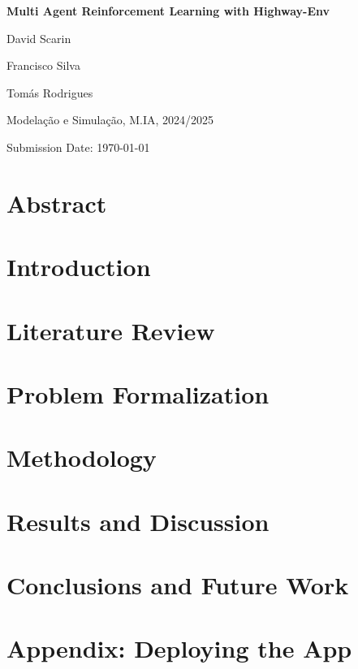 \documentclass[a4paper,10pt]{report}
\begin{document}
\begin{titlepage}
    \centering
    {\Huge\bfseries Multi Agent Reinforcement Learning with Highway-Env\par}
    \vspace{1cm}
    {\Large David Scarin\par}
    {\Large Francisco Silva\par}
    {\Large Tomás Rodrigues\par}
    \vspace{1cm}
    {\Large Modelação e Simulação, M.IA, 2024/2025\par}
    \vfill
    Submission Date: \today
\end{titlepage}

\tableofcontents
\newpage

\chapter*{Abstract}  %

\chapter{Introduction}


\chapter{Literature Review}


\chapter{Problem Formalization}


\chapter{Methodology}


\chapter{Results and Discussion}


\chapter{Conclusions and Future Work}


\printbibliography

\appendix
\chapter{Appendix: Deploying the App}

\end{document}
